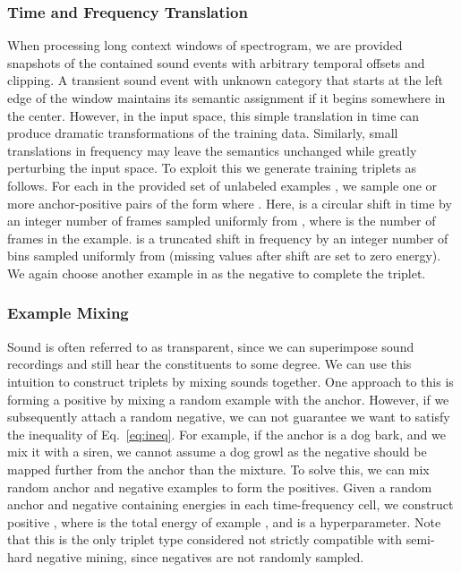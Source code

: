 \documentclass{article}
\begin{document}
\subsubsection{Time and Frequency Translation}
When processing long context windows of spectrogram, we are provided snapshots
of the contained sound events with arbitrary temporal offsets and clipping.  A
transient sound event with unknown category that starts at the left edge of the
window maintains its semantic assignment if it begins somewhere in the center.
However, in the input space, this simple translation in time can produce
dramatic transformations of the training data.  Similarly, small translations in
frequency may leave the semantics unchanged while greatly perturbing the input
space.  To exploit this we generate training triplets as follows. For each
 in the provided set of unlabeled examples
, we sample one or more anchor-positive pairs of the form
 where .  Here,
 is a circular shift in time by an integer number of frames
sampled uniformly from , where  is the number of frames in the
example.  is a truncated shift in frequency by an integer
number of bins sampled uniformly from  (missing values after shift are
set to zero energy).  We again choose another example in  as the negative to
complete the triplet.

\subsubsection{Example Mixing}
Sound is often referred to as transparent, since we can superimpose sound
recordings and still hear the constituents to some degree.  We can use this
intuition to construct triplets by mixing sounds together.  One approach to this
is forming a positive by mixing a random example with the anchor.  However, if
we subsequently attach a random negative, we can not guarantee we want to
satisfy the inequality of Eq.~\ref{eq:ineq}. For example, if the anchor is a dog
bark, and we mix it with a siren, we cannot assume a dog growl as the negative
should be mapped further from the anchor than the mixture.  To solve this, we
can mix random anchor and negative examples to form the positives. Given a
random anchor  and negative  containing energies in each
time-frequency cell, we construct positive , where  is the total energy of example , and  is a
hyperparameter.  Note that this is the only triplet type considered not strictly
compatible with semi-hard negative mining, since negatives are not randomly
sampled.
\end{document}
